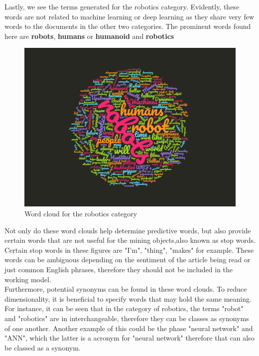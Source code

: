 Lastly, we see the terms generated for the robotics category. Evidently, these words are not related to machine learning or deep learning as they share very few words to the documents in the other two categories. The prominent words found here are \textbf{robots}, \textbf{humans} or \textbf{humanoid} and  \textbf{robotics}

\newpage


\begin{figure}[ht]
	\begin{center}
		\advance\leftskip-3cm
		\advance\rightskip-3cm
		\includegraphics[keepaspectratio=true,scale=0.4]{__resources/robotics.png}
		\caption{Word cloud for the robotics category}
		\label{robfig}
	\end{center}
\end{figure}


Not only do these word clouds help determine predictive words, but also provide certain words that are not useful for the mining objects,also known as stop words. Certain stop words in these figures are "I'm", "thing",  "makes" for example. These words can be ambiguous depending on the sentiment of the article being read or just common English phrases, therefore they should not be included in the working model. \\
Furthermore, potential synonyms can be found in these word clouds. To reduce dimensionality, it is beneficial to specify words that may hold the same meaning. For instance, it can be seen that in the category of robotics, the terms "robot" and "robotics" are in interchangeable, therefore they can be classes as synonyms of one another. Another example of this could be the phase "neural network" and "ANN", which the latter is a acronym for "neural network" therefore that can also be classed as a synonym.


